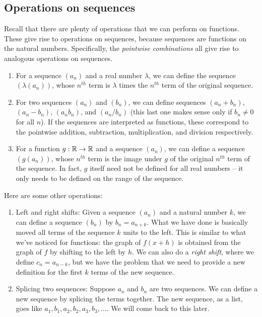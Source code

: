 \documentclass{amsart}
\begin{document}
\subsection{Operations on sequences}

Recall that there are plenty of operations that we can perform on
functions. These give rise to operations on sequences, because
sequences are functions on the natural numbers. Specifically, the {\em
pointwise combinations} all give rise to analogous operations on
sequences.

\begin{enumerate}
\item For a sequence $(a_n)$ and a real number $\lambda$, we can
  define the sequence $(\lambda(a_n))$, whose $n^{th}$ term is
  $\lambda$ times the $n^{th}$ term of the original sequence.
\item For two sequences $(a_n)$ and $(b_n)$, we can define sequences
  $(a_n + b_n)$, $(a_n - b_n)$, $(a_nb_n)$, and $(a_n/b_n)$ (this last
  one makes sense only if $b_n \ne 0$ for all $n$). If the sequences are
  interpreted as functions, these correspond to the pointwise
  addition, subtraction, multiplication, and division respectively.
\item For a function $g:\mathbb{R} \to \mathbb{R}$ and a sequence $(a_n)$, we can
  define a sequence $(g(a_n))$, whose $n^{th}$ term is the image under
  $g$ of the original $n^{th}$ term of the sequence. In fact, $g$
  itself need not be defined for all real numbers -- it only needs to
  be defined on the range of the sequence.
\end{enumerate}

Here are some other operations:

\begin{enumerate}
\item Left and right shifts: Given a sequence $(a_n)$ and a natural
  number $k$, we can define a sequence $(b_n)$ by $b_n = a_{n +
  k}$. What we have done is basically moved all terms of the sequence
  $k$ units to the left. This is similar to what we've noticed for
  functions: the graph of $f(x + h)$ is obtained from the graph of $f$
  by shifting to the left by $h$. We can also do a {\em right shift},
  where we define $c_n = a_{n-k}$, but we have the problem that we
  need to provide a new definition for the first $k$ terms of the
  new sequence.
\item Splicing two sequences: Suppose $a_n$ and $b_n$ are two
  sequences. We can define a new sequence by splicing the terms
  together. The new sequence, as a list, goes like $a_1, b_1, a_2,
  b_2, a_3, b_3,\dots$. We will come back to this later.
\end{enumerate}
\end{document}
